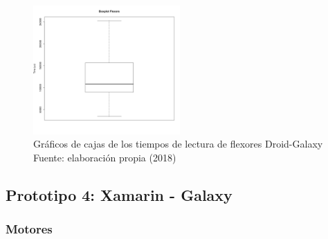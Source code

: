 \begin{figure}[H]
  \begin{center} 
   	\includegraphics[width=0.5\textwidth]{evaluation/graphics/Droid/Galaxy/BoxplotFlexorsDroidGalaxy.png} 
   	\captionsetup{justification=centering}
    \caption[Gráficos de cajas de los tiempos de lectura de flexores Droid-Galaxy]{Gráficos de cajas de los tiempos de lectura de flexores Droid-Galaxy\\Fuente: elaboración propia (2018)} 
    \label{fig:droid-galaxy-boxplot-flexors}
  \end{center}
\end{figure}





\subsection{Prototipo 4: Xamarin - Galaxy}

\subsubsection{Motores}

